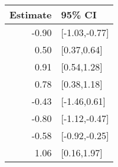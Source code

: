 \begin{tabular}{rl}
  \hline
Estimate & 95\% CI \\ 
  \hline
-0.90 & [-1.03,-0.77] \\ 
  0.50 & [0.37,0.64] \\ 
  0.91 & [0.54,1.28] \\ 
  0.78 & [0.38,1.18] \\ 
  -0.43 & [-1.46,0.61] \\ 
  -0.80 & [-1.12,-0.47] \\ 
  -0.58 & [-0.92,-0.25] \\ 
  1.06 & [0.16,1.97] \\ 
   \hline
\end{tabular}

